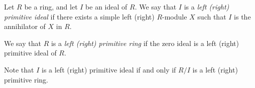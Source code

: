 \documentclass{article}
\begin{document}
Let $R$ be a ring, and let $I$ be an ideal of $R$.
We say that $I$ is a {\it left (right) primitive ideal}
if there exists a simple left (right) $R$-module $X$
such that $I$ is the annihilator of $X$ in $R$.

We say that $R$ is a {\it left (right) primitive ring}
if the zero ideal is a left (right) primitive ideal of $R$.

Note that $I$ is a left (right) primitive ideal 
if and only if $R/I$ is a left (right) primitive ring.
\end{document}
